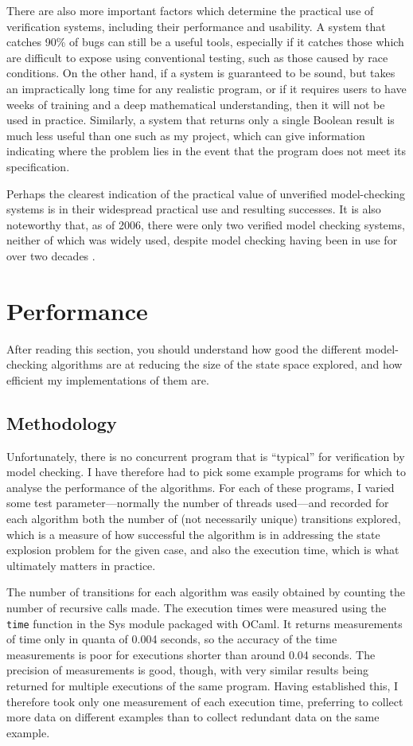 \documentclass[12pt,a4paper,twoside,openright]{report}
\begin{document}
There are also more important factors
which determine the practical use of
verification systems, including their
performance and usability. A system that
catches 90\% of bugs can still be a
useful tools, especially if it catches
those which are difficult to expose
using conventional testing, such as
those caused by race conditions. On
the other hand, if a system
is guaranteed to be sound, but takes an
impractically long time for any realistic
program, or if it requires users to have
weeks of training and a deep mathematical
understanding, then it will not be used in
practice.
Similarly, a system that
returns only a single Boolean result
is much less useful than one such as my project,
which can give information indicating where
the problem lies in the event that the
program does not meet its specification.

Perhaps the clearest indication of the
practical value of unverified
model-checking systems is in their widespread
practical use and resulting successes.
\cite{kur08, brat04, est12, kars96, cof10, mill08}
It is also noteworthy that, as of 2006,
there were only
two verified model checking
systems, neither of which was widely
used, despite model
checking having been in use for
over two decades \cite{beck06}.


\section{Performance}
After reading this section, you should
understand how good the different
model-checking algorithms are at
reducing the size of the state
space explored, and how efficient
my implementations of them are.

\subsection{Methodology}
Unfortunately, there is no concurrent program
that is ``typical'' for verification by model
checking. I have therefore had to pick some
example programs for which to analyse the performance
of the algorithms. For each of these programs, I varied
some test parameter---normally the number of threads
used---and recorded for each algorithm
both the number of (not necessarily unique) transitions
explored, which is a measure of how successful
the algorithm is in addressing the state
explosion problem for the given case, and also
the execution time, which is what ultimately
matters in practice.

The number of transitions for each algorithm was easily
obtained by counting the number of recursive calls made.
The execution times were measured using the \texttt{time}
function in the Sys module packaged with OCaml. It returns
measurements of time only in quanta of 0.004 seconds,
so the accuracy of the time measurements is poor for
executions shorter than around 0.04 seconds.
The precision of measurements
is good, though, with very similar results being returned
for multiple executions of the same program.
Having established this,
I therefore took only one measurement
of each execution time, preferring
to collect more data on different examples than to collect
redundant data on the same example.
\end{document}
